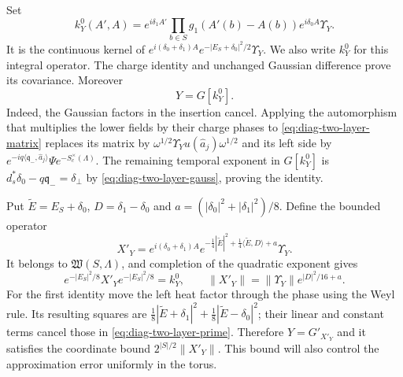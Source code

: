 Set
\begin{equation}\label{eq:diag-two-layer-kernel}
 k_Y^0(A',A)=e^{i\delta_1A'}
             \prod_{b\in S}g_1(A'(b)-A(b))e^{i\delta_0A}
                         \Upsilon_Y.
\end{equation}
It is the continuous kernel of
$e^{i(\delta_0+\delta_1)A}e^{-|E_S+\delta_0|^2/2}\Upsilon_Y$.
We also write $k_Y^0$ for this integral operator.
The charge identity and unchanged Gaussian difference prove
its covariance. Moreover
\begin{equation}\label{eq:diag-two-layer-is-insertion}
 Y=G[k_Y^0].
\end{equation}
Indeed, the Gaussian factors in the insertion cancel. Applying
the automorphism that multiplies the lower fields by their
charge phases to \eqref{eq:diag-two-layer-matrix} replaces its
matrix by $\omega^{1/2}\Upsilon_Yu(\widehat a_j)\omega^{1/2}$
and its left side by
$e^{-iq\langle\mathfrak q_-,\widehat a_j\rangle}
 \Psi e^{-S_c^\times(\Lambda)}$. The remaining temporal exponent
in $G[k_Y^0]$ is
$d_s^*\delta_0-q\mathfrak q_-=\delta_\perp$ by
\eqref{eq:diag-two-layer-gauss}, proving the identity.

Put $\widetilde E=E_S+\delta_0$, $D=\delta_1-\delta_0$ and
$a=(|\delta_0|^2+|\delta_1|^2)/8$. Define the bounded operator
\begin{equation}\label{eq:diag-two-layer-prime}
 X'_Y=e^{i(\delta_0+\delta_1)A}
       e^{-\frac14|\widetilde E|^2+
                         \frac14\langle\widetilde E,D\rangle+a}
                                                      \Upsilon_Y.
\end{equation}
It belongs to $\mathfrak W(S,\Lambda)$, and completion of the
quadratic exponent gives
\[
 e^{-|E_S|^2/8}X'_Ye^{-|E_S|^2/8}=k_Y^0,
 \qquad
 \|X'_Y\|=\|\Upsilon_Y\|e^{|D|^2/16+a}.
\]
For the first identity move the left heat factor through the
phase using the Weyl rule. Its resulting squares are
$\frac18|\widetilde E+\delta_1|^2+
 \frac18|\widetilde E-\delta_0|^2$; their linear and constant
terms cancel those in \eqref{eq:diag-two-layer-prime}. Therefore
$Y=G'_{X'_Y}$ and it satisfies the coordinate bound
$2^{|S|/2}\|X'_Y\|$. This bound will also control the approximation
error uniformly in the torus.

